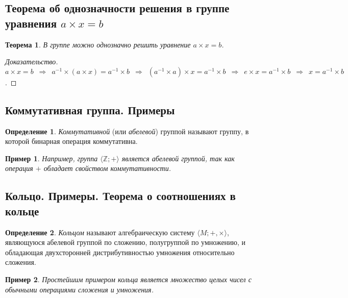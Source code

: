 \documentclass{article}
\newtheorem*{theorem*}{Теорема}
\theoremstyle{plain}
\newtheorem*{example*}{Пример}
\theoremstyle{definition}
\newtheorem{definition}{Определение}[subsection]
\begin{document}
\subsection{Теорема об однозначности решения в группе уравнения \(a \times x = b\)}

\begin{theorem*}
	В группе можно однозначно решить уравнение \(a \times x = b\).
\end{theorem*}

\begin{proof}[Доказательство]
	\(a \times x = b \enspace \Rightarrow \enspace
	a^{-1} \times (a \times x) = a^{-1} \times b \enspace \Rightarrow \enspace
	(a^{-1} \times a) \times x = a^{-1} \times b \enspace \Rightarrow \enspace
	e \times x = a^{-1} \times b \enspace \Rightarrow \enspace
	x = a^{-1} \times b\).
\end{proof}

\subsection{Коммутативная группа. Примеры}

\begin{definition}
	\textit{Коммутативной} (или \textit{абелевой}) группой называют группу, в которой бинарная операция коммутативна.
\end{definition}

\begin{example*}
	Например, группа \(\langle \mathbb{Z}; +\rangle\) является абелевой группой, так как операция \(+\) обладает свойством коммутативности.
\end{example*}

\subsection{Кольцо. Примеры. Теорема о соотношениях в кольце}

\begin{definition}
	\textit{Кольцом} называют алгебраическую систему \(\langle M; +, \times\rangle\), являющуюся абелевой группой по сложению, полугруппой по умножению, и обладающая двухсторонней дистрибутивностью умножения относительно сложения.
\end{definition}

\begin{example*}
	Простейшим примером кольца является множество целых чисел с обычными операциями сложения и умножения.
\end{example*}
\end{document}
